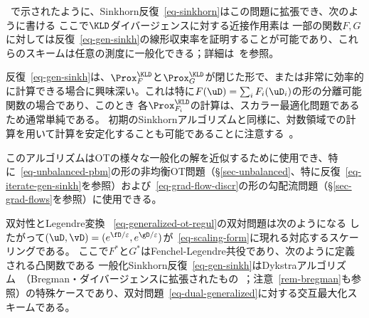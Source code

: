 ~\citep{2015-Peyre-siims,FrognerNIPS,2016-chizat-sinkhorn,karlsson2016generalized}で示されたように、Sinkhorn反復~\eqref{eq-sinkhorn}はこの問題に拡張でき、次のように書ける
ここで$\KLD$ダイバージェンスに対する近接作用素は
一部の関数$F,G$に対しては反復~\eqref{eq-gen-sinkh}の線形収束率を証明することが可能であり、これらのスキームは任意の測度に一般化できる；詳細は~\citep{2016-chizat-sinkhorn}を参照。

反復~\eqref{eq-gen-sinkh}は、$\Prox_{F}^{\KLD}$と$\Prox_{G}^{\KLD}$が閉じた形で、または非常に効率的に計算できる場合に興味深い。これは特に$F(\uD) = \sum_i F_i(\uD_i)$の形の分離可能関数の場合であり、このとき
各$\Prox_{F_i}^{\KLD}$の計算は、スカラー最適化問題であるため通常単純である。
%
初期のSinkhornアルゴリズムと同様に、対数領域での計算を用いて計算を安定化することも可能であることに注意する~\citep{2016-chizat-sinkhorn}。

このアルゴリズムはOTの様々な一般化の解を近似するために使用でき、特に~\eqref{eq-unbalanced-pbm}の形の非均衡OT問題（\S\ref{sec-unbalanced}、特に反復~\eqref{eq-iterate-gen-sinkh}を参照）および~\eqref{eq-grad-flow-discr}の形の勾配流問題（\S\ref{sec-grad-flows}を参照）に使用できる。


\begin{rem1}{双対性とLegendre変換}
~\eqref{eq-generalized-ot-regul}の双対問題は次のようになる
したがって$(\uD,\vD) = (e^{\fD/\varepsilon},e^{\gD/\varepsilon})$が~\eqref{eq-scaling-form}に現れる対応するスケーリングである。
ここで$F^*$と$G^*$はFenchel-Legendre共役であり、次のように定義される凸関数である
%
一般化Sinkhorn反復~\eqref{eq-gen-sinkh}はDykstraアルゴリズム~\citep{Dykstra83,Dykstra85}（Bregman・ダイバージェンスに拡張されたもの~\citep{bauschke-lewis,CensorReich-Dykstra}；注意~\ref{rem-bregman}も参照）の特殊ケースであり、双対問題~\eqref{eq-dual-generalized}に対する交互最大化スキームである。
\end{rem1}

